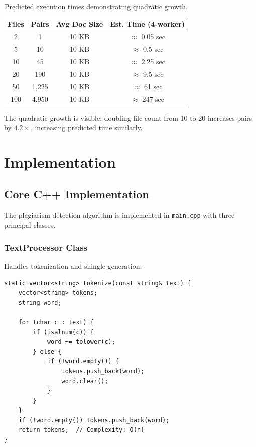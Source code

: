 \documentclass[12pt,oneside,openany]{report}
\begin{document}
\begin{table}[H]
\centering
\begin{tabular}{|c|c|c|c|}
\hline
\textbf{Files} & \textbf{Pairs} & \textbf{Avg Doc Size} & \textbf{Est. Time (4-worker)} \\
\hline
2   & 1      & 10 KB & $\approx$ 0.05 sec \\
5   & 10     & 10 KB & $\approx$ 0.5 sec \\
10  & 45     & 10 KB & $\approx$ 2.25 sec \\
20  & 190    & 10 KB & $\approx$ 9.5 sec \\
50  & 1,225  & 10 KB & $\approx$ 61 sec \\
100 & 4,950  & 10 KB & $\approx$ 247 sec \\
\hline
\end{tabular}
\caption{Predicted execution times demonstrating quadratic growth.}
\end{table}

The quadratic growth is visible: doubling file count from 10 to 20 increases pairs by $4.2\times$, increasing predicted time similarly.

\chapter{Implementation}

\section{Core C++ Implementation}

The plagiarism detection algorithm is implemented in \texttt{main.cpp} with three principal classes.

\subsection{TextProcessor Class}

Handles tokenization and shingle generation:

\begin{lstlisting}
static vector<string> tokenize(const string& text) {
    vector<string> tokens;
    string word;
    
    for (char c : text) {
        if (isalnum(c)) {
            word += tolower(c);
        } else {
            if (!word.empty()) {
                tokens.push_back(word);
                word.clear();
            }
        }
    }
    if (!word.empty()) tokens.push_back(word);
    return tokens;  // Complexity: O(n)
}
\end{lstlisting}
\end{document}
